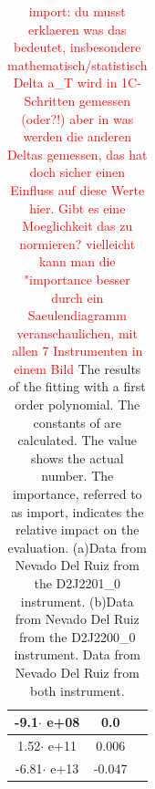 \documentclass  [
  paper    = a4,
  BCOR     = 10mm,
  twoside,
  fontsize = 12pt,
  fleqn,
  toc      = bibnumbered,
  toc      = listofnumbered,
  numbers  = noendperiod,
  headings = normal,
  listof   = leveldown,
  version  = 3.03
]                                       {scrreprt}
\begin{document}
\begin{table}
{\begin{tabular}{c|c|c}
			\midrule
			-9.1$\cdot$ e+08& 0.0\\
			\midrule
			 1.52$\cdot$ e+11&0.006\\
			\midrule
			 -6.81$\cdot$ e+13& -0.047\\
			\bottomrule
	\end{tabular}}
	\label{tab:coefNevad}
	\caption{\textcolor{red}{import: du musst erklaeren was das bedeutet, insbesondere mathematisch/statistisch}
		\textcolor{red}{Delta a\_T wird in 1C-Schritten gemessen (oder?!) aber in was werden die anderen Deltas gemessen, das hat doch sicher einen Einfluss auf diese Werte hier. Gibt es eine Moeglichkeit das zu normieren?}
		\textcolor{red}{vielleicht kann man die "importance besser durch ein Saeulendiagramm veranschaulichen, mit allen 7 Instrumenten in einem Bild} The results of the fitting with a first order polynomial. 
		The constants of  are calculated.
		The value shows the actual number. The importance,  referred to as
		import, indicates the relative impact on the evaluation.
		(a)Data from Nevado Del Ruiz from the D2J2201\_0 instrument. 
			(b)Data from Nevado Del Ruiz from the D2J2200\_0 instrument.  %
			Data from Nevado Del Ruiz from both instrument. 
		}	
	\end{table}	
\end{document}
